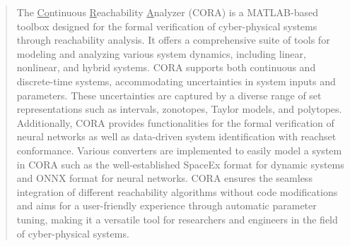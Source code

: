 
\begin{center}
    \begin{minipage}{0.8\columnwidth}
        \vspace{2cm}
        \begin{abstract}
            The \underline{Co}ntinuous \underline{R}eachability \underline{A}nalyzer (CORA) is a MATLAB-based toolbox
            designed for the formal verification of cyber-physical systems through reachability analysis.
            It offers a comprehensive suite of tools for modeling and analyzing various system dynamics, including linear, nonlinear, and hybrid systems.
            CORA supports both continuous and discrete-time systems, accommodating uncertainties in system inputs and parameters.
            These uncertainties are captured by a diverse range of set representations such as intervals, zonotopes, Taylor models, and polytopes.
            Additionally, CORA provides functionalities for the formal verification of neural networks as well as data-driven system identification with reachset conformance.
            Various converters are implemented to easily model a system in CORA such as the well-established SpaceEx format for dynamic systems and ONNX format for neural networks.
            CORA ensures the seamless integration of different reachability algorithms without code modifications and aims for a user-friendly experience through automatic parameter tuning,
            making it a versatile tool for researchers and engineers in the field of cyber-physical systems.
        \end{abstract}
    \end{minipage}
\end{center}